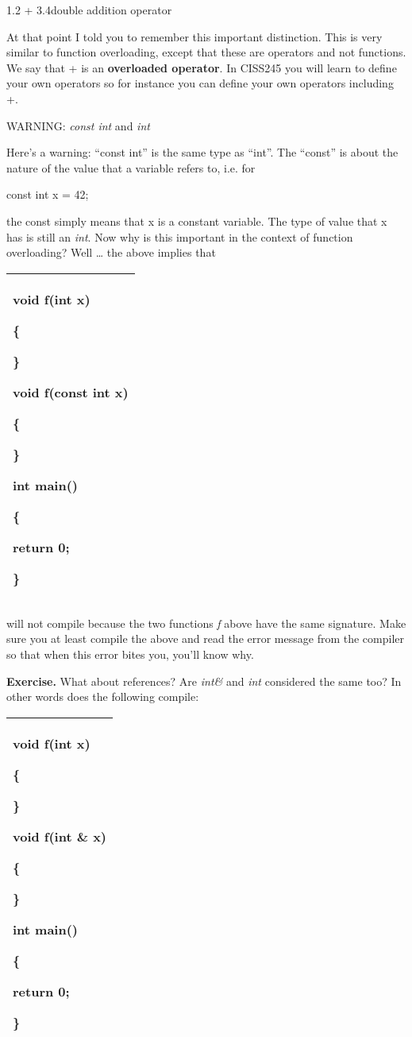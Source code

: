 \documentclass[
]{article}
\begin{document}
1.2 + 3.4double addition operator

At that point I told you to remember this important distinction. This is
very similar to function overloading, except that these are operators
and not functions. We say that + is an \textbf{overloaded operator}. In
CISS245 you will learn to define your own operators so for instance you
can define your own operators including +.

WARNING: \emph{const int} and \emph{int}

Here's a warning: ``const int'' is the same type as ``int''. The
``const'' is about the nature of the value that a variable refers to,
i.e. for

const int x = 42;

the const simply means that x is a constant variable. The type of value
that x has is still an \emph{int}. Now why is this important in the
context of function overloading? Well \ldots{} the above implies that

\begin{longtable}[]{@{}l@{}}
\toprule
\endhead
\begin{minipage}[t]{0.97\columnwidth}\raggedright
void f(int x)

\{

\}

void f(const int x)

\{

\}

int main()

\{

return 0;

\}\strut
\end{minipage}\tabularnewline
\bottomrule
\end{longtable}

will not compile because the two functions \emph{f} above have the same
signature. Make sure you at least compile the above and read the error
message from the compiler so that when this error bites you, you'll know
why.

\textbf{Exercise.} What about references? Are \emph{int\&} and
\emph{int} considered the same too? In other words does the following
compile:

\begin{longtable}[]{@{}l@{}}
\toprule
\endhead
\begin{minipage}[t]{0.97\columnwidth}\raggedright
void f(int x)

\{

\}

void f(int \& x)

\{

\}

int main()

\{

return 0;

\}\strut
\end{minipage}\tabularnewline
\bottomrule
\end{longtable}
\end{document}
